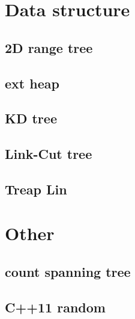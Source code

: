 \section{Data structure}
	\subsection{2D range tree}
		
	\subsection{ext heap}
		
	\subsection{KD tree}
		
	\subsection{Link-Cut tree}
		
%		
%		
	\subsection{Treap Lin}
		

\section{Other}
	\subsection{count spanning tree}
		
	\subsection{C++11 random}
		
%		
